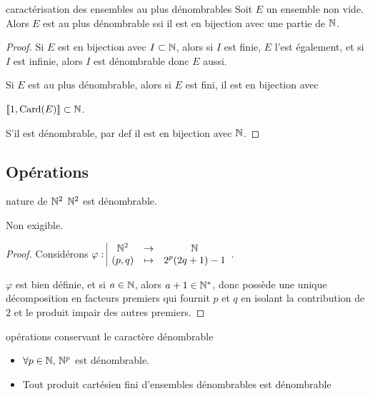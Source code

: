 \begin{proposition}{caractérisation des ensembles au plus dénombrables}{}
    Soit $E$ un ensemble non vide. Alors $E$ est au plus dénombrable ssi il est en 
    bijection avec une partie de $\mathbb{N}$.
\end{proposition}


\begin{proof}
    Si $E$ est en bijection avec $I \subset \mathbb{N}$, alors si $I$ est finie, 
    $E$ l'est également, et si $I$ est infinie, alors $I$ est dénombrable donc $E$ aussi.

    \lvspace Si $E$ est au plus dénombrable, alors si $E$ est fini, il est en bijection 
    avec 
    
    $[\![1, \text{Card}(E)]\!] \subset \mathbb{N}$.

    S'il est dénombrable, par def il est en bijection avec $\mathbb{N}$.
\end{proof}


\subsection{Opérations }

\begin{theoreme}{nature de $\mathbb{N}^2$}{}
    $\mathbb{N}^2$ est dénombrable.
\end{theoreme}

Non exigible. 

\begin{proof}
    Considérons $\varphi: \space \begin{array}{|ccc} \displaystyle \mathbb{N}^2 & \to & \displaystyle \mathbb{N} \\ \displaystyle (p, q) & \mapsto & \displaystyle 2^p (2q + 1) - 1 \end{array}$.

    $\varphi$ est bien définie, et si $a \in \mathbb{N}$, alors $a + 1 \in \mathbb{N}^*$, donc possède 
    une unique décomposition en facteurs premiers qui fournit $p$ et $q$ en isolant 
    la contribution de $2$ et le produit impair des autres premiers. 
\end{proof}

\begin{proposition}{opérations conservant le caractère dénombrable}{}
    \begin{itemize}
        \item $\forall p \in \mathbb{N}, \, \mathbb{N}^p$ est dénombrable.
        \item Tout produit cartésien fini d'ensembles dénombrables est dénombrable
    \end{itemize}

\end{proposition}



